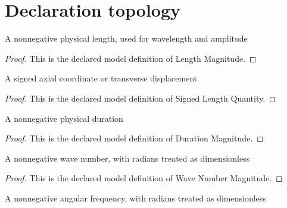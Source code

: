 \section{Declaration topology}
\begin{definition}
  \label{def:physics:phyx-mini-0305:phyxminiproblems-problemphyxmini0305-lengthmagnitude}
  A nonnegative physical length, used for wavelength and amplitude
\end{definition}
\begin{proof}
  This is the declared model definition of Length Magnitude.
\end{proof}
\begin{definition}
  \label{def:physics:phyx-mini-0305:phyxminiproblems-problemphyxmini0305-signedlengthquantity}
  A signed axial coordinate or transverse displacement
\end{definition}
\begin{proof}
  This is the declared model definition of Signed Length Quantity.
\end{proof}
\begin{definition}
  \label{def:physics:phyx-mini-0305:phyxminiproblems-problemphyxmini0305-durationmagnitude}
  A nonnegative physical duration
\end{definition}
\begin{proof}
  This is the declared model definition of Duration Magnitude.
\end{proof}
\begin{definition}
  \label{def:physics:phyx-mini-0305:phyxminiproblems-problemphyxmini0305-wavenumbermagnitude}
  A nonnegative wave number, with radians treated as dimensionless
\end{definition}
\begin{proof}
  This is the declared model definition of Wave Number Magnitude.
\end{proof}
\begin{definition}
  \label{def:physics:phyx-mini-0305:phyxminiproblems-problemphyxmini0305-angularfrequencymagnitude}
  A nonnegative angular frequency, with radians treated as dimensionless
\end{definition}
